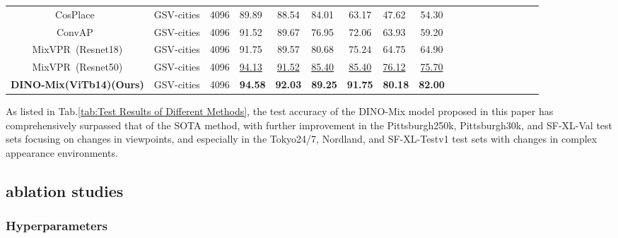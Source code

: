 \begin{table*}[h]
\begin{tabular}{c p{1.6cm} c p{0.9cm} c p{0.8cm}  c p{0.9cm}  c p{0.8cm}  c p{0.8cm} c p{0.8cm}  c p{0.8cm}  c p{0.8cm}}
    CosPlace~\cite{berton_rethinking_2022}  & GSV-cities& 4096 & 89.89 & 88.54&84.01&63.17&47.62&54.30 \\
    ConvAP~\cite{ali-bey_gsv-cities_2022}  & GSV-cities& 4096 & 91.52& 89.67 &76.95&72.06&63.93&59.20 \\
    MixVPR~\cite{ali-bey_mixvpr_2023}(Resnet18)&GSV-cities& 4096& 91.75& 89.57&80.68&75.24&64.75&64.90 \\
    MixVPR~\cite{ali-bey_mixvpr_2023}(Resnet50)&GSV-cities& 4096& \underline{94.13} & \underline{91.52}&\underline{85.40}&\underline{85.40}&\underline{76.12}&\underline{75.70} \\
\textbf{DINO-Mix(ViTb14)(Ours)}&GSV-cities& 4096&\textbf{94.58} &\textbf{92.03}&\textbf{89.25}&\textbf{91.75}&\textbf{80.18}&\textbf{82.00} \\
    \hline
    \end{tabular}
    \label{tab:Test Results of Different Methods}
\end{table*}


As listed in Tab.\ref{tab:Test Results of Different Methods}, the test accuracy of the DINO-Mix model proposed in this paper has comprehensively surpassed that of the SOTA method, with further improvement in the Pittsburgh250k, Pittsburgh30k, and SF-XL-Val test sets focusing on changes in viewpoints, and especially in the Tokyo24/7, Nordland, and SF-XL-Testv1 test sets with changes in complex appearance environments.


\subsection{ablation studies}
\label{ablation studies}
    \subsubsection{Hyperparameters}

